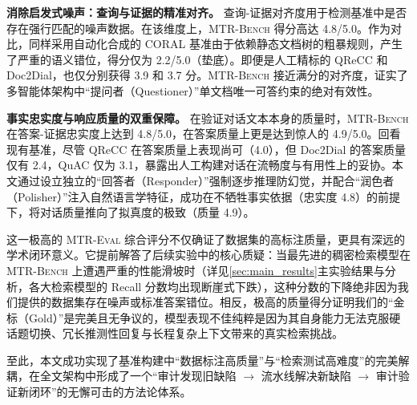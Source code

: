 \textbf{消除启发式噪声：查询与证据的精准对齐。} 查询-证据对齐度用于检测基准中是否存在强行匹配的噪声数据。在该维度上，\textsc{MTR-Bench} 得分高达 4.8/5.0。作为对比，同样采用自动化合成的 CORAL 基准由于依赖静态文档树的粗暴规则，产生了严重的语义错位，得分仅为 2.2/5.0（垫底）。即便是人工精标的 QReCC 和 Doc2Dial，也仅分别获得 3.9 和 3.7 分。\textsc{MTR-Bench} 接近满分的对齐度，证实了多智能体架构中“提问者（Questioner）”单文档唯一可答约束的绝对有效性。

\textbf{事实忠实度与响应质量的双重保障。} 在验证对话文本本身的质量时，\textsc{MTR-Bench} 在答案-证据忠实度上达到 4.8/5.0，在答案质量上更是达到惊人的 4.9/5.0。回看现有基准，尽管 QReCC 在答案质量上表现尚可（4.0），但 Doc2Dial 的答案质量仅有 2.4，QuAC 仅为 3.1，暴露出人工构建对话在流畅度与有用性上的妥协。本文通过设立独立的“回答者（Responder）”强制逐步推理防幻觉，并配合“润色者（Polisher）”注入自然语言学特征，成功在不牺牲事实依据（忠实度 4.8）的前提下，将对话质量推向了拟真度的极致（质量 4.9）。

这一极高的 \textsc{MTR-Eval} 综合评分不仅确证了数据集的高标注质量，更具有深远的学术闭环意义。它提前解答了后续实验中的核心质疑：当最先进的稠密检索模型在 \textsc{MTR-Bench} 上遭遇严重的性能滑坡时（详见\ref{sec:main_results}主实验结果与分析，各大检索模型的 Recall 分数均出现断崖式下跌），这种分数的下降绝非因为我们提供的数据集存在噪声或标准答案错位。相反，极高的质量得分证明我们的“金标（Gold）”是完美且无争议的，模型表现不佳纯粹是因为其自身能力无法克服硬话题切换、冗长推测性回复与长程复杂上下文带来的真实检索挑战。

至此，本文成功实现了基准构建中“数据标注高质量”与“检索测试高难度”的完美解耦，在全文架构中形成了一个“审计发现旧缺陷 $\rightarrow$ 流水线解决新缺陷 $\rightarrow$ 审计验证新闭环”的无懈可击的方法论体系。















